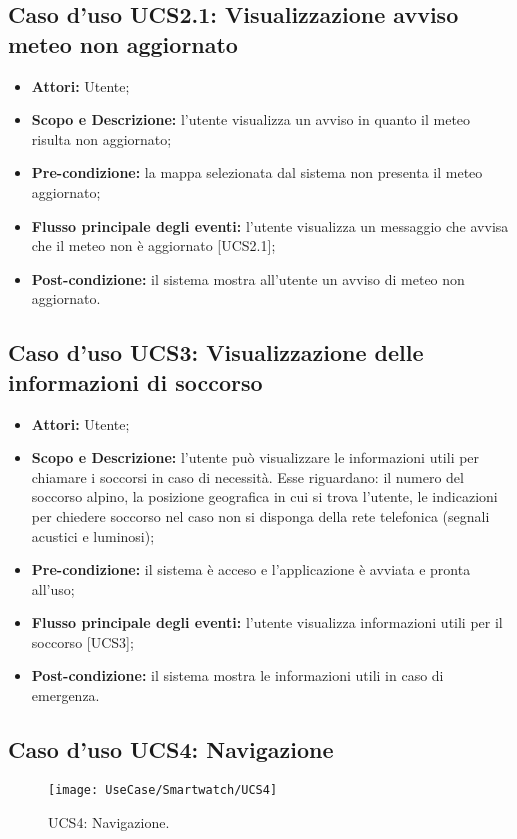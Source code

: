 \subsection{Caso d'uso UCS2.1: Visualizzazione avviso meteo non aggiornato}
\begin{itemize}
\item \textbf{Attori:} Utente;
\item \textbf{Scopo e Descrizione:} l'utente visualizza un avviso in quanto il meteo risulta non aggiornato;
\item \textbf{Pre-condizione:} la mappa selezionata dal sistema non presenta il meteo aggiornato; 
\item \textbf{Flusso principale degli eventi:} l'utente visualizza un messaggio che avvisa che il meteo non è aggiornato [UCS2.1];
\item \textbf{Post-condizione:} il sistema mostra all'utente un avviso di meteo non aggiornato.
\end{itemize}

\subsection{Caso d'uso UCS3: Visualizzazione delle informazioni di soccorso}
\begin{itemize}
\item \textbf{Attori:} Utente;
\item \textbf{Scopo e Descrizione:} l'utente può visualizzare le informazioni utili per chiamare i soccorsi in caso di necessità. Esse riguardano: il numero del soccorso alpino, la posizione geografica in cui si trova l'utente, le indicazioni per chiedere soccorso nel caso non si disponga della rete telefonica (segnali acustici e luminosi);
\item \textbf{Pre-condizione:} il sistema è acceso e l'applicazione è avviata e pronta all'uso;
\item \textbf{Flusso principale degli eventi:} l'utente visualizza informazioni utili per il soccorso [UCS3];
\item \textbf{Post-condizione:} il sistema mostra le informazioni utili in caso di emergenza.
\end{itemize}

\subsection{Caso d'uso UCS4: Navigazione}

\begin{figure}[H]
\centering
\texttt{[image: UseCase/Smartwatch/UCS4]}
\caption{UCS4: Navigazione.}
\end{figure}

